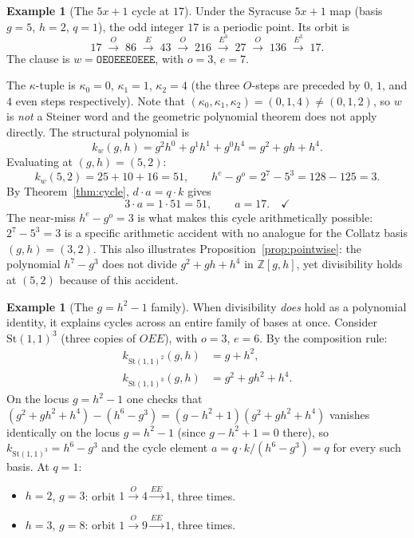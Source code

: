\documentclass[12pt]{article}
\theoremstyle{definition}
\newtheorem{example}[theorem]{Example}
\theoremstyle{remark}
\newcommand{\ZZ}{\mathbb{Z}}
\newcommand{\St}{\mathrm{St}}
\newcommand{\kpoly}{k}
\begin{document}
\begin{example}[The $5x+1$ cycle at $17$]
\label{ex:5x1}
Under the Syracuse $5x+1$ map (basis $g = 5$, $h = 2$, $q = 1$), the odd
integer $17$ is a periodic point.  Its orbit is
\[
  17 \;\xrightarrow{O}\; 86 \;\xrightarrow{E}\; 43
     \;\xrightarrow{O}\; 216 \;\xrightarrow{E^3}\; 27
     \;\xrightarrow{O}\; 136 \;\xrightarrow{E^3}\; 17.
\]
The clause is $w = \texttt{OEOEEEOEEE}$, with $o = 3$, $e = 7$.

The $\kappa$-tuple is $\kappa_0 = 0$, $\kappa_1 = 1$, $\kappa_2 = 4$
(the three $O$-steps are preceded by $0$, $1$, and $4$ even steps
respectively).  Note that $(\kappa_0, \kappa_1, \kappa_2) = (0,1,4) \neq
(0,1,2)$, so $w$ is \emph{not} a Steiner word and the geometric polynomial
theorem does not apply directly.  The structural polynomial is
\[
  \kpoly_w(g,h) = g^2 h^0 + g^1 h^1 + g^0 h^4 = g^2 + gh + h^4.
\]
Evaluating at $(g,h) = (5,2)$:
\[
  \kpoly_w(5,2) = 25 + 10 + 16 = 51,
  \qquad
  h^e - g^o = 2^7 - 5^3 = 128 - 125 = 3.
\]
By Theorem~\ref{thm:cycle}, $d \cdot a = q \cdot k$ gives
\[
  3 \cdot a = 1 \cdot 51 = 51, \qquad a = 17. \quad \checkmark
\]
The near-miss $h^e - g^o = 3$ is what makes this cycle arithmetically possible:
$2^7 - 5^3 = 3$ is a specific arithmetic accident with no analogue for the
Collatz basis $(g,h) = (3,2)$.  This also illustrates Proposition~\ref{prop:pointwise}:
the polynomial $h^7 - g^3$ does not divide $g^2 + gh + h^4$ in $\ZZ[g,h]$,
yet divisibility holds at $(5,2)$ because of this accident.
\end{example}

\begin{example}[The $g = h^2 - 1$ family]
\label{ex:gh2}
When divisibility \emph{does} hold as a polynomial identity, it explains cycles
across an entire family of bases at once.  Consider $\St(1,1)^3$ (three copies
of $OEE$), with $o = 3$, $e = 6$.  By the composition rule:
\begin{align*}
  \kpoly_{\St(1,1)^2}(g,h) &= g + h^2, \\
  \kpoly_{\St(1,1)^3}(g,h) &= g^2 + gh^2 + h^4.
\end{align*}
On the locus $g = h^2 - 1$ one checks that $(g^2 + gh^2 + h^4) - (h^6 - g^3)
= (g - h^2 + 1)(g^2 + gh^2 + h^4)$ vanishes identically on the locus $g = h^2-1$
(since $g - h^2 + 1 = 0$ there), so
$\kpoly_{\St(1,1)^3} = h^6 - g^3$ and the cycle element
$a = q\cdot\kpoly/(h^6-g^3) = q$ for every such basis.  At $q=1$:
\begin{itemize}
  \item $h=2$, $g=3$: orbit $1\xrightarrow{O}4\xrightarrow{EE}1$, three times.
  \item $h=3$, $g=8$: orbit $1\xrightarrow{O}9\xrightarrow{EE}1$, three times.
\end{itemize}
\end{example}
\end{document}
